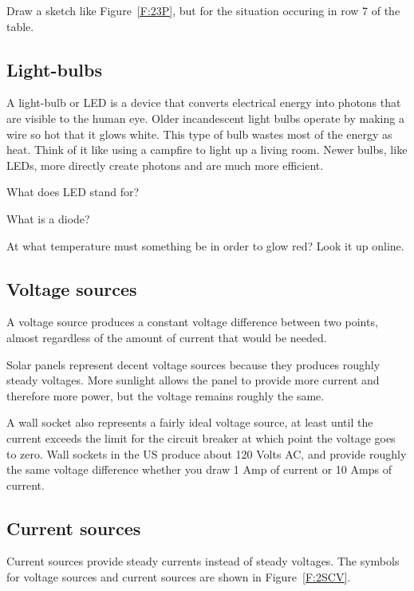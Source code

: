 \begin{blevel}
Draw a sketch like Figure~\ref{F:23P}, but for the situation occuring in row 7 of the table.
\end{blevel}
\subsection{Light-bulbs}
A light-bulb or LED is a device that converts electrical energy into photons that are visible to the human eye. Older incandescent light bulbs operate by making a wire so hot that it glows white. This type of bulb wastes most of the energy as heat. Think of it like using a campfire to light up a living room.
Newer bulbs, like LEDs, more directly create photons and are much more efficient.

\begin{alevel}
What does LED stand for?
\end{alevel}

\begin{blevel}
What is a diode?
\end{blevel}

\begin{alevel}
At what temperature must something be in order to glow red? Look it up online.
\end{alevel}

\subsection{Voltage sources}
A voltage source produces a constant voltage difference between two points, almost regardless of the amount of current that would be needed.
\par
Solar panels represent decent voltage sources because they produces roughly steady voltages. More sunlight allows the panel to provide more current and therefore more power, but the voltage remains roughly the same.
\par
A wall socket also represents a fairly ideal voltage source, at least until the current exceeds the limit for the circuit breaker at which point the voltage goes to zero. Wall sockets in the US produce about 120 Volts AC, and provide roughly the same voltage difference whether you draw 1 Amp of current or 10 Amps of current. 

\par
\subsection{Current sources}
Current sources provide steady currents instead of steady voltages. The symbols for voltage sources and current sources are shown in Figure~\ref{F:2SCV}.
\par

